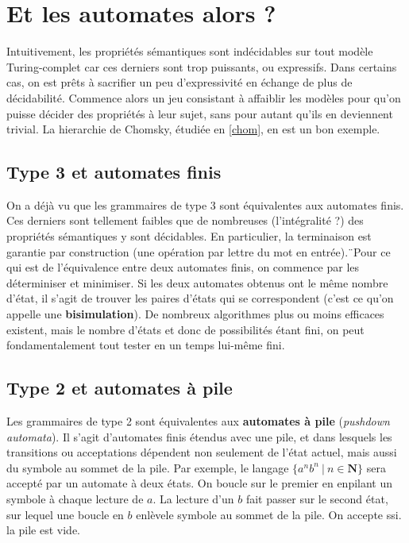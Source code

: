 \section{Et les automates alors ?}
\label{autoalors}



Intuitivement, les propriétés sémantiques sont indécidables sur tout modèle Turing-complet car ces derniers sont trop puissants, ou expressifs. Dans certains cas, on est prêts à sacrifier un peu d'expressivité en échange de plus de décidabilité.
Commence alors un jeu consistant à affaiblir les modèles pour qu'on puisse décider des propriétés à leur sujet, sans pour autant qu'ils en deviennent trivial. 
La hierarchie de Chomsky, étudiée en \ref{chom}, en est un bon exemple. 

\subsection{Type 3 et automates finis}

On a déjà vu que les grammaires de type 3 sont équivalentes aux automates finis. Ces derniers sont tellement faibles que de nombreuses (l'intégralité ?) des propriétés sémantiques y sont décidables. En particulier, la terminaison est garantie par construction (une opération par lettre du mot en entrée).¨Pour ce qui est de l'équivalence entre deux automates finis, on commence par les déterminiser et minimiser. Si les deux automates obtenus ont le même nombre d'état, il s'agit de trouver les paires d'états qui se correspondent (c'est ce qu'on appelle une \textbf{bisimulation}). De nombreux algorithmes plus ou moins efficaces existent, mais le nombre d'états et donc de possibilités étant fini, on peut fondamentalement tout tester en un temps lui-même fini.

\subsection{Type 2 et automates à pile}

Les grammaires de type 2 sont équivalentes aux \textbf{automates à pile} (\textit{pushdown automata}). Il s'agit d'automates finis étendus avec une pile, et dans lesquels les transitions ou acceptations dépendent non seulement de l'état actuel, mais aussi du symbole au sommet de la pile. Par exemple, le langage $\{a^nb^n ~|~ n \in \mathbf{N}\}$ sera accepté par un automate à deux états. On boucle sur le premier en enpilant un symbole à chaque lecture de $a$. La lecture d'un $b$ fait passer sur le second état, sur lequel une boucle en $b$ enlèvele symbole au sommet de la pile. On accepte ssi. la pile est vide. 

